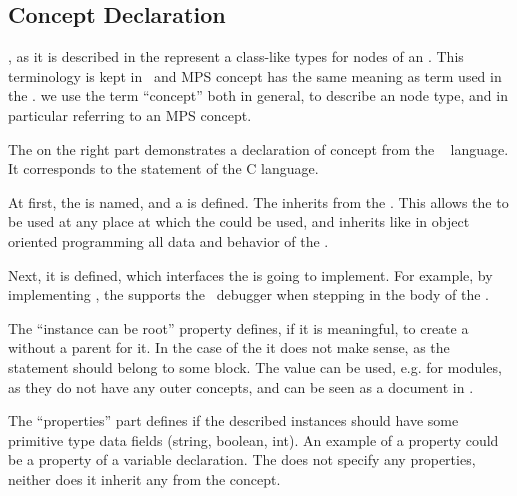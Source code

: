 \subsection{Concept Declaration}
\label{mpsconceptdeclaration}

, as it is described in the  represent a class-like types for nodes of an . This terminology is kept in \jbmps\ and 
MPS concept has the same meaning as  term used in the . we use the term ``concept'' both in general, to describe an  node type,
and in particular referring to an MPS concept.

%

The  on the right part demonstrates a declaration of  concept from the \mbdr\  language.
It corresponds to the  statement of the C language.

At first, the  is named, and a  is defined. The   inherits from the  .
This allows the  to be used at any place at which the  could be used, and inherits like in object oriented programming
all data and behavior of the .

Next, it is defined, which interfaces the  is going to implement. For example, by implementing , the 
supports the \mbdr\ debugger when stepping in the body of the .

The ``instance can be root'' property defines, if it is meaningful, to create a  without a parent  for it. In the case
of the  it does not make sense, as the statement should belong to some block. The  value can be used, e.g. for modules,
as they do not have any outer concepts, and can be seen as a document in \jbmps.

The ``properties'' part defines if the described  instances should have some primitive type data fields (string, boolean, int).
An example of a property could be a  property of a variable declaration. The   does not specify any 
properties, neither does it inherit any from the  concept.


